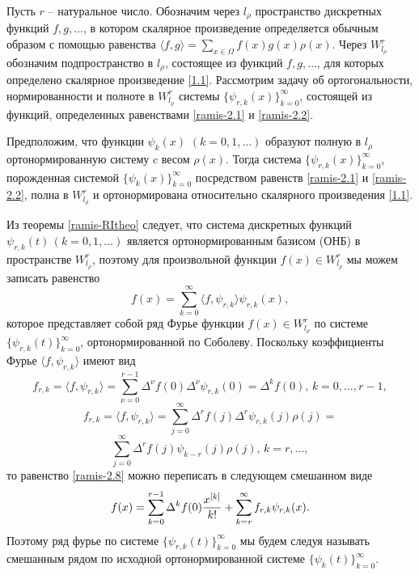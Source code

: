 Пусть $r$ -- натуральное число. Обозначим через $l_\rho$ пространство дискретных функций $f, g, \ldots$, в котором скалярное произведение определяется обычным образом с помощью равенства $\langle f,g\rangle = \sum\limits_{x\in\Omega}f(x)g(x)\rho(x)$.
Через $W^r_{l_\rho}$ обозначим подпространство в $l_\rho$, состоящее из функций $f, g, \ldots$, для которых определено скалярное произведение \eqref{1.1}.
Рассмотрим  задачу об ортогональности, нормированности и полноте в $W^r_{l_\rho}$ системы $\{\psi_{r,k}(x)\}_{k=0}^\infty$, состоящей из функций, определенных равенствами   \eqref{ramis-2.1} и \eqref{ramis-2.2}.

\begin{theorem}\label{ramis-RItheo}
Предположим, что функции $\psi_k(x)$ $(k=0,1,\ldots)$ образуют полную в $l_\rho$ ортонормированную систему  c весом   $\rho(x)$. Тогда система $\{\psi_{r,k}(x)\}_{k=0}^\infty$, порожденная системой $\{\psi_{k}(x)\}_{k=0}^\infty$
 посредством равенств \eqref{ramis-2.1} и \eqref{ramis-2.2}, полна  в $W^r_{l_\rho}$ и ортонормирована относительно скалярного произведения \eqref{1.1}.
\end{theorem}

Из теоремы \ref{ramis-RItheo} следует, что система дискретных функций $\psi_{r,k}(t)\, (k=0,1,\ldots)$
является ортонормированным базисом (ОНБ) в пространстве $W^r_{l_\rho}$, поэтому для произвольной функции $f(x)\in W^r_{l_\rho}$ мы можем записать равенство
  \begin{equation}\label{ramis-2.8}
 f(x)= \sum_{k=0}^\infty\langle f,\psi_{r,k}\rangle \psi_{r,k}(x),
  \end{equation}
которое представляет собой  ряд Фурье функции $f(x)\in W^r_{l_\rho}$ по системе
$\{\psi_{r,k}(t)\}_{k=0}^\infty$, ортонормированной по Соболеву. Поскольку коэффициенты Фурье $\langle f,\psi_{r,k}\rangle$ имеют  вид
\begin{equation}\label{ramis-2.9}
f_{r,k}=\langle f,\psi_{r,k}\rangle =\sum_{\nu=0}^{r-1}\Delta^\nu f(0)\Delta^\nu\psi_{r,k}(0)=\Delta^kf(0),\, k=0,\ldots, r-1,
 \end{equation}
 $$
f_{r,k}= \langle f,\psi_{r,k}\rangle =\sum_{j=0}^\infty\Delta^rf(j)\Delta^r\psi_{r,k}(j)\rho(j)=
 $$
\begin{equation}\label{ramis-2.10}
\sum_{j=0}^{\infty}\Delta^rf(j)\psi_{k-r}(j)\rho(j),\, k=r,\ldots,
 \end{equation}
то равенство \eqref{ramis-2.8} можно переписать в следующем  смешанном виде
  \begin{equation}\label{ramis-2.11}
 f(x)= \sum_{k=0}^{r-1}\Delta^kf(0){x^{[k]}\over k!} +\sum_{k=r}^\infty f_{r,k} \psi_{r,k}(x).
  \end{equation}
Поэтому ряд фурье по системе $\{\psi_{r,k}(t)\}_{k=0}^\infty$ мы будем следуя
\cite{ramis-Shar9, sobleg-Shar17, equ130-Shar13, laplas-Shar14, sobleg-Shar15, ramis-SharT1, equ102-Shar19, sobleg-Shar18, ramis-SharII} называть смешанным рядом по исходной ортонормированной системе $\{\psi_{k}(t)\}_{k=0}^\infty$.


